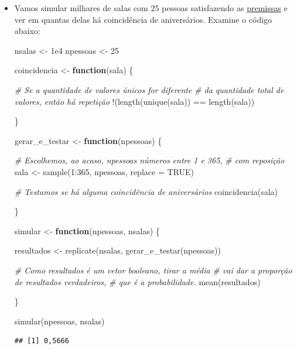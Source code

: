 \documentclass[
  11pt]{report}
\newenvironment{Shaded}{\begin{snugshade}}{\end{snugshade}}
\newcommand{\AttributeTok}[1]{\textcolor[rgb]{0.77,0.63,0.00}{#1}}
\newcommand{\CommentTok}[1]{\textcolor[rgb]{0.56,0.35,0.01}{\textit{#1}}}
\newcommand{\ConstantTok}[1]{\textcolor[rgb]{0.00,0.00,0.00}{#1}}
\newcommand{\ControlFlowTok}[1]{\textcolor[rgb]{0.13,0.29,0.53}{\textbf{#1}}}
\newcommand{\DecValTok}[1]{\textcolor[rgb]{0.00,0.00,0.81}{#1}}
\newcommand{\FloatTok}[1]{\textcolor[rgb]{0.00,0.00,0.81}{#1}}
\newcommand{\FunctionTok}[1]{\textcolor[rgb]{0.00,0.00,0.00}{#1}}
\newcommand{\NormalTok}[1]{#1}
\newcommand{\OtherTok}[1]{\textcolor[rgb]{0.56,0.35,0.01}{#1}}
\newcommand{\SpecialCharTok}[1]{\textcolor[rgb]{0.00,0.00,0.00}{#1}}
\renewenvironment{Shaded}{
    \begin{mdframed}[%
      roundcorner=2pt,%
      innerleftmargin=5pt,%
      innerrightmargin=5pt,%
      topline=true,%
      leftline=true,%
      rightline=true,%
      bottomline=true,%
      linewidth=0.5pt,%
      linecolor=black!20,%
      backgroundcolor=black!2,%
      skipabove=2ex,%
      skipbelow=2.5ex%
    ]%
  }
  {
    \end{mdframed}
  }
\begin{document}
\begin{itemize}
\item
  Vamos simular milhares de salas com $25$ pessoas satisfazendo as \protect\hyperlink{premissas}{premissas} e ver em quantas delas há coincidência de aniversários. Examine o código abaixo:

\begin{Shaded}
\begin{Highlighting}[]
\NormalTok{nsalas }\OtherTok{\textless{}{-}} \FloatTok{1e4}
\NormalTok{npessoas }\OtherTok{\textless{}{-}} \DecValTok{25}

\NormalTok{coincidencia }\OtherTok{\textless{}{-}} \ControlFlowTok{function}\NormalTok{(sala) \{}

  \CommentTok{\# Se a quantidade de valores únicos for diferente }
  \CommentTok{\# da quantidade total de valores, então há repetição  }
  \SpecialCharTok{!}\NormalTok{(}\FunctionTok{length}\NormalTok{(}\FunctionTok{unique}\NormalTok{(sala)) }\SpecialCharTok{==} \FunctionTok{length}\NormalTok{(sala))}

\NormalTok{\}}

\NormalTok{gerar\_e\_testar }\OtherTok{\textless{}{-}} \ControlFlowTok{function}\NormalTok{(npessoas) \{}

  \CommentTok{\# Escolhemos, ao acaso, npessoas números entre 1 e 365,}
  \CommentTok{\# com reposição}
\NormalTok{  sala }\OtherTok{\textless{}{-}} \FunctionTok{sample}\NormalTok{(}\DecValTok{1}\SpecialCharTok{:}\DecValTok{365}\NormalTok{, npessoas, }\AttributeTok{replace =} \ConstantTok{TRUE}\NormalTok{)}

  \CommentTok{\# Testamos se há alguma coincidência de aniversários}
  \FunctionTok{coincidencia}\NormalTok{(sala)}

\NormalTok{\}}

\NormalTok{simular }\OtherTok{\textless{}{-}} \ControlFlowTok{function}\NormalTok{(npessoas, nsalas) \{}

\NormalTok{  resultados }\OtherTok{\textless{}{-}} \FunctionTok{replicate}\NormalTok{(nsalas, }\FunctionTok{gerar\_e\_testar}\NormalTok{(npessoas))}

  \CommentTok{\# Como resultados é um vetor booleano, tirar a média}
  \CommentTok{\# vai dar a proporção de resultados verdadeiros,}
  \CommentTok{\# que é a probabilidade.}
  \FunctionTok{mean}\NormalTok{(resultados)}

\NormalTok{\}}

\FunctionTok{simular}\NormalTok{(npessoas, nsalas)}
\end{Highlighting}
\end{Shaded}

\begin{verbatim}
## [1] 0,5666
\end{verbatim}
\end{itemize}
\end{document}
